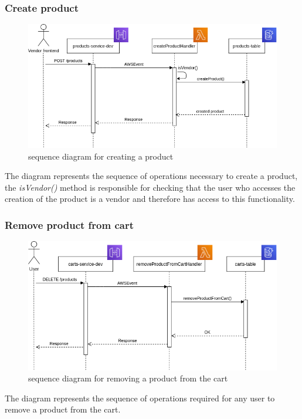 \subsubsection{Create product}
\begin{figure}[!h]
    \vspace{5px}
    \includegraphics[scale=0.5]{../../../../Images/Diagrammi/maintainerManual/createProductSequence.png}
    \centering
    \caption{sequence diagram for creating a product}
\end{figure}
The diagram represents the sequence of operations necessary to create a product, the \textit{isVendor()} method is responsible for checking that the user who accesses the creation of the product is a vendor and therefore has access to this functionality.
\pagebreak
\subsubsection{Remove product from cart}
\begin{figure}[!h]
    \vspace{5px}
    \includegraphics[scale=0.5]{../../../../Images/Diagrammi/maintainerManual/removeProductFromCart.png}
    \centering
    \caption{sequence diagram for removing a product from the cart}
\end{figure}
The diagram represents the sequence of operations required for any user to remove a product from the cart.
\pagebreak
